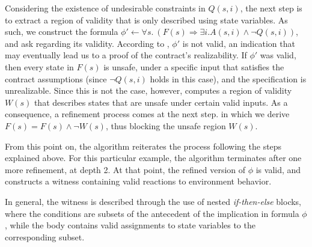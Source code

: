 \iffalse
but Fig.~\ref{fg:snippet} shows part of the generated
$Q(s,i)$, in SMT-LIB format (pre-fix notation), where the input variables are
part of the constraints.~\footnote{The names in the snippet have been simplified to match the rest of the paper.} The variable \textit{\%init} is used in the underlying
machinery as a flag to indicate whether the current state is initial or not
(true and false, respectively). While the actual code is hundreds of lines long, looking at the specific snippet shows us how the valid subset may contain constraints over the inputs, that violate the assumptions. The conjunction in Fig.~\ref{fg:snippet} contains the constraints $(<= i4 \ 2.0)$ and $(<= i5 \ 2.0)$. These conjuncts define a region where the contract assumptions are violated, since it is possible to assign values to $i4$ and $i5$ such that $i4 > 1.0$ and $i5 > 1.0$ respectively. This shows that $Q(s,i)$ is not necessarily a region that satisfies the assumptions in a strict manner, and it is imperative to extract a new region, that only provides constraints over the state variables.
\fi


Considering the existence of undesirable constraints in $Q(s,i)$, the next step
is to extract a region of validity that is only described using state variables.
As such, we construct the formula $\phi' \gets \forall s. \ (F(s) \Rightarrow \exists
i. A(s,i) \land \lnot Q(s,i))$, and ask \aeval regarding its validity. According
to \aeval, $\phi'$ is not valid, an indication that may eventually lead us to a
proof of the contract's realizability. If $\phi'$ was valid, then every state in
$F(s)$ is unsafe, under a specific input that satisfies the contract
assumptions (since $\lnot Q(s,i)$ holds in this case), and the specification is unrealizable. Since this is not the case,
however, \aeval computes a region of validity $W(s)$ that describes states that are unsafe under certain valid inputs. As a consequence, a refinement process comes at the next step. in which we derive $F(s) = F(s) \land \lnot W(s)$, thus blocking the unsafe region $W(s)$.

From this point on, the algorithm reiterates the process following the steps
explained above. For this particular example, the algorithm terminates after one
more refinement, at depth 2. At that point, the refined version of
$\phi$ is valid, and \aeval constructs a witness containing valid reactions to
environment behavior. 
\iffalse
Fig.~\ref{fg:witness} provides a snippet of
that witness, after being translated to a C implementation.
\fi
In general, the witness is described through the use of nested \textit{if-then-else} blocks, where the conditions are subsets of the antecedent of the implication in formula $\phi$, while the body contains valid assignments to
state variables to the corresponding subset.

